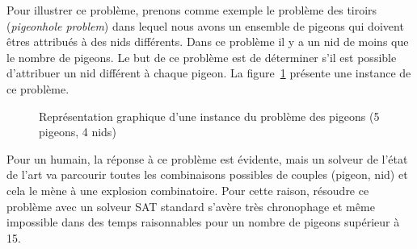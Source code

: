 Pour illustrer ce problème, prenons comme exemple le problème des tiroirs (\textit{pigeonhole problem}) dans lequel nous avons un ensemble de pigeons qui doivent êtres attribués à des nids différents. Dans ce problème il y a un nid de moins que le nombre de pigeons.
Le but de ce problème est de déterminer s'il est possible d'attribuer un nid différent à chaque pigeon.
La figure~\ref{fig:holefr} présente une instance de ce problème.


\begin{figure}[!htbp]
	\centering
	\caption{Représentation graphique d'une instance du problème des pigeons (5 pigeons, 4 nids)}
	\label{fig:holefr}
\end{figure}


Pour un humain, la réponse à ce problème est évidente, mais un solveur de l'état de l'art va parcourir toutes 
les combinaisons possibles de couples (pigeon, nid) et cela le mène à une explosion combinatoire.
Pour cette raison, résoudre ce problème avec un solveur SAT standard s'avère très chronophage et même impossible dans des temps raisonnables
pour un nombre de pigeons supérieur à 15.

%
%

